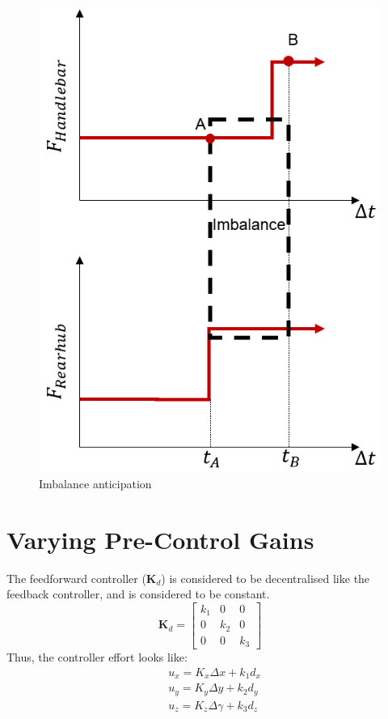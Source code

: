 \begin{figure}[h!]
	\centering
	\includegraphics[scale = 0.45]{Contents/Resources/Precontrol/Motivation.png}
	\caption{Imbalance anticipation}
	\label{fig:precontrolMotivation}
\end{figure}


\section{Varying Pre-Control Gains}
The feedforward controller ($\mathbf{K}_d$) is considered to be decentralised like the feedback controller, and is considered to be constant. $$\mathbf{K}_d = \begin{bmatrix}
	k_1&0&0\\
	0&k_2&0\\
	0&0&k_3
\end{bmatrix}$$
Thus, the controller effort looks like:
\begin{align*}
	&u_x = K_x\Delta x + k_1d_x\\
	&u_y = K_y\Delta y + k_2d_y\\
	&u_z = K_z\Delta \gamma + k_3d_z
\end{align*}

